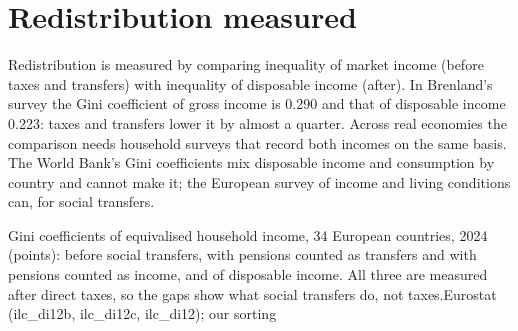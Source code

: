 \section{Redistribution measured}\label{sec:b3:transfers-and-incentives:redistribution}

Redistribution is measured by comparing inequality of market income (before taxes
and transfers) with inequality of disposable income (after). In Brenland's survey
the Gini coefficient of gross income is 0.290 and that of disposable income 0.223:
taxes and transfers lower it by almost a quarter. %
Across real economies the comparison needs household surveys that record both
incomes on the same basis. The World Bank's Gini coefficients mix disposable income
and consumption by country and cannot make it; the European survey of income and
living conditions can, for social transfers.

\begin{omchart}{Gini coefficients of equivalised household income, 34 European
countries, 2024 (points): before social transfers, with pensions counted as
transfers and with pensions counted as income, and of disposable income. All three
are measured after direct taxes, so the gaps show what social transfers do, not
taxes.}{Eurostat (ilc\_di12b, ilc\_di12c, ilc\_di12); our sorting}
\end{omchart}

